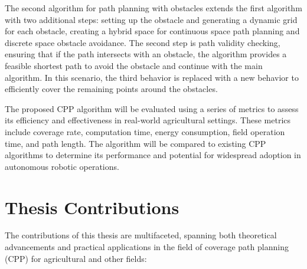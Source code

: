 The second algorithm for path planning with obstacles extends the first algorithm with two additional steps: setting up the obstacle and generating a dynamic grid for each obstacle, creating a hybrid space for continuous space path planning and discrete space obstacle avoidance. The second step is path validity checking, ensuring that if the path intersects with an obstacle, the algorithm provides a feasible shortest path to avoid the obstacle and continue with the main algorithm. In this scenario, the third behavior is replaced with a new behavior to efficiently cover the remaining points around the obstacles.  


\vspace*{3mm} 

The proposed CPP algorithm will be evaluated using a series of metrics to assess its efficiency and effectiveness in real-world agricultural settings. These metrics include coverage rate, computation time, energy consumption, field operation time, and path length. The algorithm will be compared to existing CPP algorithms to determine its performance and potential for widespread adoption in autonomous robotic operations.




\section{Thesis Contributions}

The contributions of this thesis are multifaceted, spanning both theoretical advancements and practical applications in the field of coverage path planning (CPP) for agricultural and other fields:

